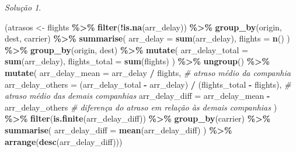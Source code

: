 \documentclass[
]{latex/krantz}
\newenvironment{Shaded}{\begin{snugshade}}{\end{snugshade}}
\newcommand{\AttributeTok}[1]{\textcolor[rgb]{0.13,0.29,0.53}{#1}}
\newcommand{\CommentTok}[1]{\textcolor[rgb]{0.56,0.35,0.01}{\textit{#1}}}
\newcommand{\FunctionTok}[1]{\textcolor[rgb]{0.13,0.29,0.53}{\textbf{#1}}}
\newcommand{\NormalTok}[1]{#1}
\newcommand{\OtherTok}[1]{\textcolor[rgb]{0.56,0.35,0.01}{#1}}
\newcommand{\SpecialCharTok}[1]{\textcolor[rgb]{0.81,0.36,0.00}{\textbf{#1}}}
\theoremstyle{definition}
\theoremstyle{definition}
\theoremstyle{definition}
\theoremstyle{definition}
\theoremstyle{remark}
\newtheorem*{solution}{Solução}
\begin{document}
\begin{solution}
\begin{Shaded}
\begin{Highlighting}[]
\NormalTok{(atrasos }\OtherTok{\textless{}{-}}\NormalTok{ flights }\SpecialCharTok{\%\textgreater{}\%} 
                \FunctionTok{filter}\NormalTok{(}\SpecialCharTok{!}\FunctionTok{is.na}\NormalTok{(arr\_delay)) }\SpecialCharTok{\%\textgreater{}\%}
                \FunctionTok{group\_by}\NormalTok{(origin, dest, carrier) }\SpecialCharTok{\%\textgreater{}\%}
                \FunctionTok{summarise}\NormalTok{(}
                    \AttributeTok{arr\_delay =} \FunctionTok{sum}\NormalTok{(arr\_delay),}
                    \AttributeTok{flights =} \FunctionTok{n}\NormalTok{()}
\NormalTok{                ) }\SpecialCharTok{\%\textgreater{}\%}
                \FunctionTok{group\_by}\NormalTok{(origin, dest) }\SpecialCharTok{\%\textgreater{}\%}
                \FunctionTok{mutate}\NormalTok{(}
                    \AttributeTok{arr\_delay\_total =} \FunctionTok{sum}\NormalTok{(arr\_delay),}
                    \AttributeTok{flights\_total =} \FunctionTok{sum}\NormalTok{(flights)}
\NormalTok{                ) }\SpecialCharTok{\%\textgreater{}\%}
                \FunctionTok{ungroup}\NormalTok{() }\SpecialCharTok{\%\textgreater{}\%}
                \FunctionTok{mutate}\NormalTok{(        }
                    \AttributeTok{arr\_delay\_mean =}\NormalTok{ arr\_delay }\SpecialCharTok{/}\NormalTok{ flights, }\CommentTok{\# atraso médio da companhia}
                    \AttributeTok{arr\_delay\_others =}\NormalTok{ (arr\_delay\_total }\SpecialCharTok{{-}}\NormalTok{ arr\_delay) }\SpecialCharTok{/}\NormalTok{ (flights\_total }\SpecialCharTok{{-}}\NormalTok{ flights), }\CommentTok{\# atraso médio das demais companhias}
                    \AttributeTok{arr\_delay\_diff =}\NormalTok{ arr\_delay\_mean }\SpecialCharTok{{-}}\NormalTok{ arr\_delay\_others }\CommentTok{\# diferença do atraso em relação às demais companhias}
\NormalTok{                ) }\SpecialCharTok{\%\textgreater{}\%}
                \FunctionTok{filter}\NormalTok{(}\FunctionTok{is.finite}\NormalTok{(arr\_delay\_diff)) }\SpecialCharTok{\%\textgreater{}\%}
                \FunctionTok{group\_by}\NormalTok{(carrier) }\SpecialCharTok{\%\textgreater{}\%}
                \FunctionTok{summarise}\NormalTok{(}
                    \AttributeTok{arr\_delay\_diff =} \FunctionTok{mean}\NormalTok{(arr\_delay\_diff)}
\NormalTok{                ) }\SpecialCharTok{\%\textgreater{}\%}
                \FunctionTok{arrange}\NormalTok{(}\FunctionTok{desc}\NormalTok{(arr\_delay\_diff)))}
\end{Highlighting}
\end{Shaded}


\end{solution}
\end{document}
